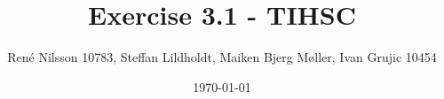 \documentclass[]{report}
\begin{document}
\title{Exercise 3.1 - TIHSC}
\author{René Nilsson 10783, Steffan Lildholdt, Maiken Bjerg Møller, Ivan Grujic 10454}
\date{\today}
\maketitle
{}

\tableofcontents







\end{document}
